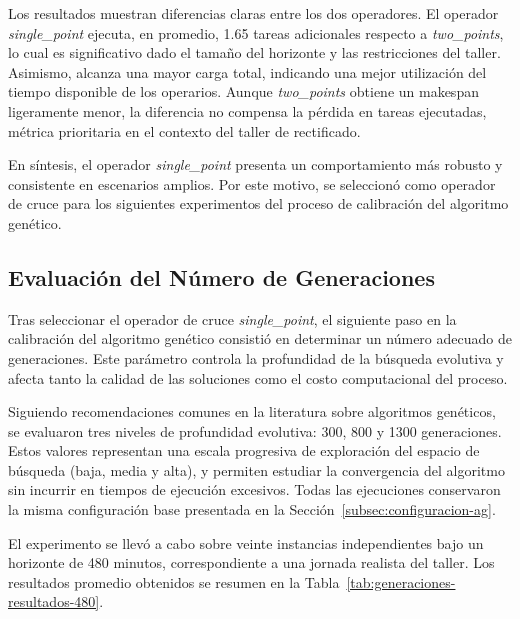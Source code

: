 Los resultados muestran diferencias claras entre los dos operadores. El operador \textit{single\_point} ejecuta, en promedio, 1.65 tareas adicionales respecto a \textit{two\_points}, lo cual es significativo dado el tamaño del horizonte y las restricciones del taller. Asimismo, alcanza una mayor carga total, indicando una mejor utilización del tiempo disponible de los operarios. Aunque \textit{two\_points} obtiene un makespan ligeramente menor, la diferencia no compensa la pérdida en tareas ejecutadas, métrica prioritaria en el contexto del taller de rectificado.

En síntesis, el operador \textit{single\_point} presenta un comportamiento más robusto y consistente en escenarios amplios. Por este motivo, se seleccionó como operador de cruce para los siguientes experimentos del proceso de calibración del algoritmo genético.

\subsection{Evaluación del Número de Generaciones}
\label{subsec:generaciones}

Tras seleccionar el operador de cruce \textit{single\_point}, el siguiente paso en la calibración del algoritmo genético consistió en determinar un número adecuado de generaciones. Este parámetro controla la profundidad de la búsqueda evolutiva y afecta tanto la calidad de las soluciones como el costo computacional del proceso. 

Siguiendo recomendaciones comunes en la literatura sobre algoritmos genéticos, se evaluaron tres niveles de profundidad evolutiva: 300, 800 y 1300 generaciones. Estos valores representan una escala progresiva de exploración del espacio de búsqueda (baja, media y alta), y permiten estudiar la convergencia del algoritmo sin incurrir en tiempos de ejecución excesivos. Todas las ejecuciones conservaron la misma configuración base presentada en la Sección~\ref{subsec:configuracion-ag}.

El experimento se llevó a cabo sobre veinte instancias independientes bajo un horizonte de 480 minutos, correspondiente a una jornada realista del taller. Los resultados promedio obtenidos se resumen en la Tabla~\ref{tab:generaciones-resultados-480}.

\begin{table}[htbp]
\centering
\small
\caption{Resultados promedio del AG para distintos números de generaciones (480 minutos).}
\label{tab:generaciones-resultados-480}
\end{table}


